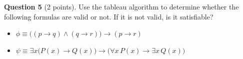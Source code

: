 \documentclass[12pt]{article}
\begin{document}
\vspace{0.2cm}

\noindent\textbf{Question 5} (2 points). Use the tableau algorithm to determine whether the following formulas are valid or not. If it is not valid, is it satisfiable?
\begin{itemize}
    \item[a)] $\phi \equiv \bigl( (p \rightarrow q) \wedge (q \rightarrow r) \bigr) \rightarrow (p \rightarrow r)$
    \item[b)] $\psi \equiv \exists x \bigl( P(x) \rightarrow Q(x) \bigr) \rightarrow \bigl( \forall x\, P(x) \rightarrow \exists x\, Q(x) \bigr)$
\end{itemize}
\end{document}
